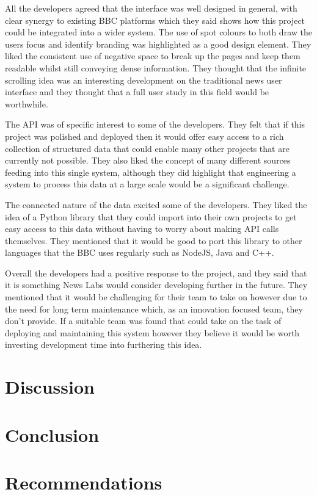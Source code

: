 \documentclass[12pt,titlepage]{article}
\begin{document}
  All the developers agreed that the interface was well designed in general,
  with clear synergy to existing BBC platforms which they said shows how this
  project could be integrated into a wider system. The use of spot colours to
  both draw the users focus and identify branding was highlighted as a good
  design element. They liked the consistent use of negative space to break up
  the pages and keep them readable whilst still conveying dense information.
  They thought that the infinite scrolling idea was an interesting development
  on the traditional news user interface and they thought that a full user study
  in this field would be worthwhile.

  The API was of specific interest to some of the developers. They felt that if
  this project was polished and deployed then it would offer easy access to a
  rich collection of structured data that could enable many other projects that
  are currently not possible. They also liked the concept of many different
  sources feeding into this single system, although they did highlight that
  engineering a system to process this data at a large scale would be a
  significant challenge.

  The connected nature of the data excited some of the developers. They liked
  the idea of a Python library that they could import into their own projects to
  get easy access to this data without having to worry about making API calls
  themselves. They mentioned that it would be good to port this library to other
  languages that the BBC uses regularly such as NodeJS, Java and C++.

  Overall the developers had a positive response to the project, and they said
  that it is something News Labs would consider developing further in the
  future. They mentioned that it would be challenging for their team to take on
  however due to the need for long term maintenance which, as an innovation
  focused team, they don't provide. If a suitable team was found that could take
  on the task of deploying and maintaining this system however they believe it
  would be worth investing development time into furthering this idea.

\section{Discussion}


\section{Conclusion}


\section{Recommendations}



\end{document}

